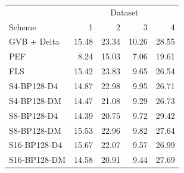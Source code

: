 \begin{tabular}{lrrrr}
\toprule
 & \multicolumn{4}{c}{Dataset} \\
Scheme & 1 & 2 & 3 & 4 \\
\midrule
GVB + Delta & 15.48 & 23.34 & 10.26 & 28.55 \\
PEF & 8.24 & 15.03 & 7.06 & 19.61 \\
FLS & 15.42 & 23.83 & 9.65 & 26.54 \\
S4-BP128-D4 & 14.87 & 22.98 & 9.95 & 26.71 \\
S4-BP128-DM & 14.47 & 21.08 & 9.29 & 26.73 \\
S8-BP128-D4 & 14.39 & 20.75 & 9.72 & 29.42 \\
S8-BP128-DM & 15.53 & 22.96 & 9.82 & 27.64 \\
S16-BP128-D4 & 15.67 & 22.07 & 9.57 & 26.99 \\
S16-BP128-DM & 14.58 & 20.91 & 9.44 & 27.69 \\
\bottomrule
\end{tabular}
